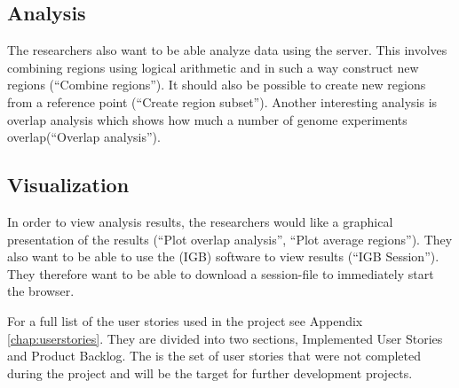 \subsection{Analysis}
The researchers also want to be able analyze data using the server. This involves combining regions using logical arithmetic and in such a way construct new regions (``Combine regions''). It should also be possible to create new regions from a reference point (``Create region subset''). Another interesting analysis is overlap analysis which shows how much a number of genome experiments overlap(``Overlap analysis'').

\subsection{Visualization}
In order to view analysis results, the researchers would like a graphical presentation of the results (``Plot overlap analysis'', ``Plot average regions''). They also want to be able to use the  (IGB)\cite{IGB} software to view results (``IGB Session''). They therefore want to be able to download a session-file to immediately start the browser.

For a full list of the user stories used in the project see Appendix \ref{chap:userstories}. They are divided into two sections, Implemented User Stories and Product Backlog. The  is the set of user stories that were not completed during the project and will be the target for further development projects.